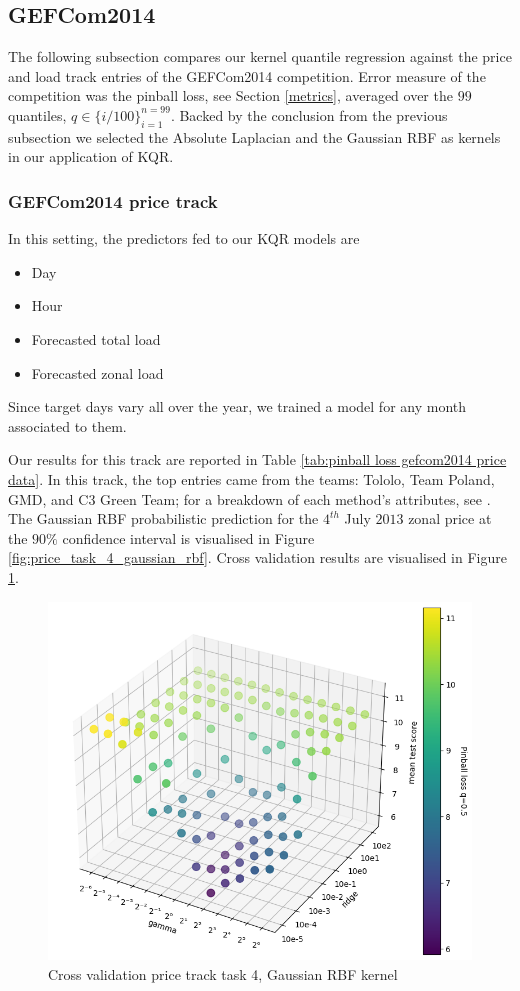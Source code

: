\subsection{GEFCom2014}
The following subsection compares our kernel quantile regression against the price and load track entries of the GEFCom2014 competition.
Error measure of the competition was the pinball loss, see Section \ref{metrics}, averaged over the $99$ quantiles, $q \in \{i/100\}_{i=1}^{n=99}$. Backed by the conclusion from the previous subsection we selected the Absolute Laplacian and the Gaussian RBF as kernels in our application of KQR.


\subsubsection{GEFCom2014 price track}
In this setting, the predictors fed to our KQR models are
\begin{itemize}
    \item Day
    \item Hour
    \item Forecasted total load
    \item Forecasted zonal load
\end{itemize}
Since target days vary all over the year, we trained a model for any month associated to them.

Our results for this track are reported in Table \ref{tab:pinball loss gefcom2014 price data}. In this track, the top entries came from the teams: Tololo, Team Poland, GMD, and C3 Green Team; for a breakdown of each method's attributes, see \cite[Table 8]{hong2016probabilistic}. 
The Gaussian RBF probabilistic prediction for the $4^{th}$ July $2013$ zonal price at the $90\%$ confidence interval is visualised in Figure \ref{fig:price_task_4_gaussian_rbf}.
Cross validation results are visualised in Figure \ref{fig:cv_scatter}.

\begin{figure}
    \includegraphics[width=\textwidth]{images/cv_scatter.png}
    \caption{Cross validation price track task 4, Gaussian RBF kernel}
    \label{fig:cv_scatter}
\end{figure}



